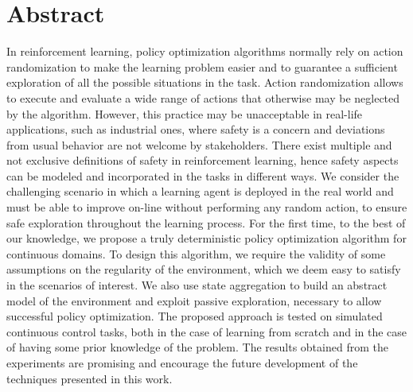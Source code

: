 
\begingroup
\let\clearpage\relax
\let\cleardoublepage\relax
\let\cleardoublepage\relax

\chapter*{Abstract}
In reinforcement learning, policy optimization algorithms normally rely on action randomization to make the learning problem easier and to guarantee a sufficient exploration of all the possible situations in the task. Action randomization allows to execute and evaluate a wide range of actions that otherwise may be neglected by the algorithm. However, this practice may be unacceptable in real-life applications, such as industrial ones, where safety is a concern and deviations from usual behavior are not welcome by stakeholders. There exist multiple and not exclusive definitions of safety in reinforcement learning, hence safety aspects can be modeled and incorporated in the tasks in different ways. We consider the challenging scenario in which a learning agent is deployed in the real world and must be able to improve on-line without performing any random action, to ensure safe exploration throughout the learning process. For the first time, to the best of our knowledge, we propose a truly deterministic policy optimization algorithm for continuous domains. To design this algorithm, we require the validity of some assumptions on the regularity of the environment, which we deem easy to satisfy in the scenarios of interest. We also use state aggregation to build an abstract model of the environment and exploit passive exploration, necessary to allow successful policy optimization. The proposed approach is tested on simulated continuous control tasks, both in the case of learning from scratch and in the case of having some prior knowledge of the problem. The results obtained from the experiments are promising and encourage the future development of the techniques presented in this work.

\vfill

\endgroup